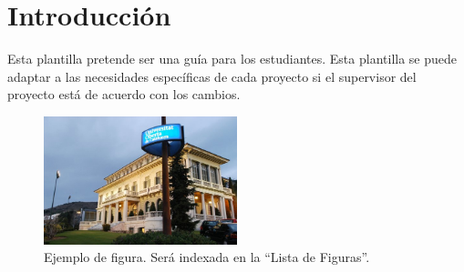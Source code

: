 \documentclass[12pt,a4paper,twoside]{book}
\begin{document}
\setcounter{section}{0} %
\renewcommand{\thesection}{\arabic{section}} %


\hypersetup{pageanchor=true}


\newpage

\newpage

\pagestyle{fancy}
\renewcommand{\chaptermark}[1]{ \markboth{#1}{}}
\renewcommand{\sectionmark}[1]{\markright{ \thesection.\ #1}}
\lhead[\fancyplain{}{\bfseries\thepage}]{\fancyplain{}{\bfseries\rightmark}}
\rhead[\fancyplain{}{\bfseries\leftmark}]{\fancyplain{}{\bfseries\thepage}}
\cfoot{}

\cleardoublepage
{}
{}
\tableofcontents
\cleardoublepage
{}
{}
\listoffigures
\cleardoublepage
{}
{}
\listoftables

\thispagestyle{empty}


\pagestyle{fancy}
\renewcommand{\chaptermark}[1]{ \markboth{#1}{}}
\renewcommand{\sectionmark}[1]{\markright{ \thesection.\ #1}}
\lhead[\fancyplain{}{\bfseries\thepage}]{\fancyplain{}{\bfseries\rightmark}}
\rhead[\fancyplain{}{\bfseries\leftmark}]{\fancyplain{}{\bfseries\thepage}}
\cfoot{}

\onehalfspacing

\section{Introducción}

Esta plantilla pretende ser una guía para los estudiantes. Esta plantilla se puede adaptar a las necesidades específicas de cada proyecto si el supervisor del proyecto está de acuerdo con los cambios.

\begin{figure}[h]
\centering
\includegraphics[width=0.5\textwidth]{./figs/image1.png}
\caption{Ejemplo de figura. Será indexada en la “Lista de Figuras”.}
\label{fig:figura_ejemplo}
\end{figure}
\end{document}
